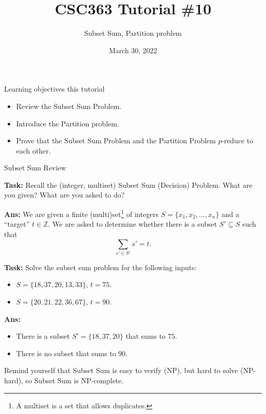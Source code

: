 \documentclass{beamer}
\title{CSC363 Tutorial \#10}
\subtitle{Subset Sum, Partition problem}
\date{March 30, 2022}
\institute{}
\begin{document}
\maketitle

\begin{frame}{Learning objectives this tutorial}
\begin{itemize}
\item Review the Subset Sum Problem.
\item Introduce the Partition problem.
\item Prove that the Subset Sum Problem and the Partition Problem $p$-reduce to each other.
\end{itemize}
\end{frame}

\begin{frame}{Subset Sum Review}

\textbf{Task:} Recall the (integer, multiset) Subset Sum (Decision) Problem. What are you given? What are you asked to do?

\pause

\textbf{Ans:} We are given a finite (multi)set\footnote{A multiset is a set that allows duplicates.} of integers $S = \{x_1, x_2, \ldots, x_n\}$ and a ``target'' $t \in \mathbb Z$. We are asked to determine whether there is a subset $S' \subseteq S$ such that 
$$\sum_{s' \in S'} s' = t.$$


\pause

\textbf{Task:} Solve the subset sum problem for the following inputs:

\begin{itemize}
    \item $S = \{18, 37, 20, 13, 33\}$, $t = 75$.
    \item $S = \{20, 21, 22, 36, 67\}$, $t = 90$.
\end{itemize}

\pause

\textbf{Ans:}
\begin{itemize}
    \item There is a subset $S' = \{18, 37, 20\}$ that sums to $75$.
    \item There is no subset that sums to $90$.
\end{itemize}

\pause

Remind yourself that Subset Sum is easy to verify (NP), but hard to solve (NP-hard), so Subset Sum is NP-complete.

\end{frame}
\end{document}
